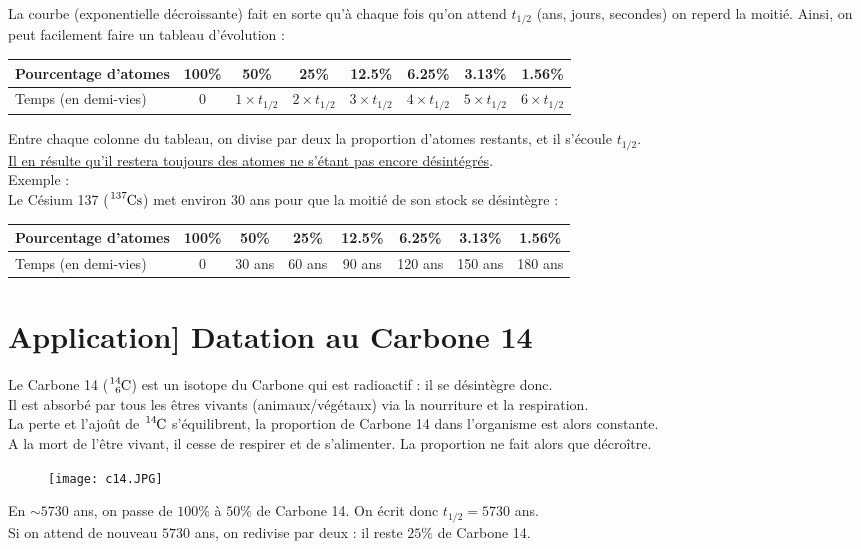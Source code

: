 \documentclass[a4paper]{article}
\begin{document}
\begin{Large}
\noindent La courbe (exponentielle décroissante) fait en sorte qu'à chaque fois qu'on attend $t_{1/2}$ (ans, jours, secondes) on reperd la moitié. Ainsi, on peut facilement faire un tableau d'évolution :\\
\begin{center} 
\begin{tabular}{l | c | c | c | c | c | c | c }
Pourcentage d'atomes & 100\% & 50\% & 25\% & 12.5\% & 6.25\% & 3.13\% & 1.56\% \\
\hline
Temps (en demi-vies) & 0 & $1\times t_{1/2}$ & $2\times t_{1/2}$ & $3\times t_{1/2}$ & $4\times t_{1/2}$ & $5\times t_{1/2}$ & $6\times t_{1/2}$ \\
\end{tabular}
\end{center}
Entre chaque colonne du tableau, on divise par deux la proportion d'atomes restants, et il s'écoule $t_{1/2}$.\\
\underline{Il en résulte qu'il restera toujours des atomes ne s'étant pas encore désintégrés}.\\

\vfill
\noindent Exemple :\\
Le Césium 137 ($\ce{^{137}Cs}$) met environ $30$ ans pour que la moitié de son stock se désintègre :

\begin{center} 
\begin{tabular}{l | c | c | c | c | c | c | c }
Pourcentage d'atomes & 100\% & 50\% & 25\% & 12.5\% & 6.25\% & 3.13\% & 1.56\% \\
\hline
Temps (en demi-vies) & 0 & 30 ans & 60 ans & 90 ans & 120 ans & 150 ans & 180 ans \\
\end{tabular}
\end{center}


\newpage
\section*{Application] Datation au Carbone 14}
Le Carbone 14 ($\ce{^{14}_{6}C}$) est un isotope du Carbone qui est radioactif : il se désintègre donc. \\
Il est absorbé par tous les êtres vivants (animaux/végétaux) via la nourriture et la respiration.\\
La perte et l'ajoût de $\ce{^{14}C}$ s'équilibrent, la proportion de Carbone 14 dans l'organisme est alors constante.\\
A la mort de l'être vivant, il cesse de respirer et de s'alimenter. La proportion ne fait alors que décroître.
\begin{figure}[H]
\begin{center}
\texttt{[image: c14.JPG]}
\end{center} 
\end{figure}
\noindent En $\sim 5730$ ans, on passe de $100\%$ à $50\%$ de Carbone 14. On écrit donc $t_{1/2}=5730$ ans.\\
Si on attend de nouveau $5730$ ans, on redivise par deux : il reste $25\%$ de Carbone 14.\\


\end{Large}
\end{document}
